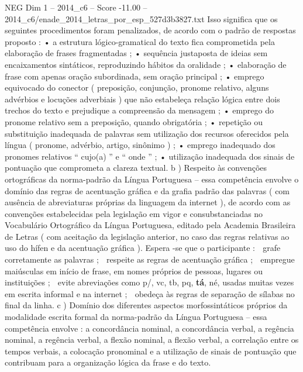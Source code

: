 \begin{textsample}{NEG Dim 1 – 2014\_c6 – Score -11.00 – 2014\_c6/enade\_2014\_letras\_por\_esp\_527d3b3827.txt}
Isso significa que os seguintes procedimentos foram penalizados, de acordo com o padrão de respostas proposto : • a estrutura lógico-gramatical do texto fica comprometida pela elaboração de frases fragmentadas ; • sequência justaposta de ideias sem encaixamentos sintáticos, reproduzindo hábitos da oralidade ; • elaboração de frase com apenas oração subordinada, sem oração principal ; • emprego equivocado do conector ( preposição, conjunção, pronome relativo, alguns advérbios e locuções adverbiais ) que não estabeleça relação lógica entre dois trechos do texto e prejudique a compreensão da mensagem ; • emprego do pronome relativo sem a preposição, quando obrigatória ; • repetição ou substituição inadequada de palavras sem utilização dos recursos oferecidos pela língua ( pronome, advérbio, artigo, sinônimo ) ; • emprego inadequado dos pronomes relativos “ cujo(a) ” e “ onde ” ; • utilização inadequada dos sinais de pontuação que comprometa a clareza textual. b ) Respeito às convenções ortográficas da norma-padrão da Língua Portuguesa – essa competência envolve o domínio das regras de acentuação gráfica e da grafia padrão das palavras ( com ausência de abreviaturas próprias da linguagem da internet ), de acordo com as convenções estabelecidas pela legislação em vigor e consubstanciadas no Vocabulário Ortográfico da Língua Portuguesa, editado pela Academia Brasileira de Letras ( com aceitação da legislação anterior, no caso das regras relativas ao uso do hífen e da acentuação gráfica ).
Espera -se que o participante :  grafe corretamente as palavras ;  respeite as regras de acentuação gráfica ;  empregue maiúsculas em início de frase, em nomes próprios de pessoas, lugares ou instituições ;  evite abreviações como p/, vc, tb, pq, \textbf{tá}, né, usadas muitas vezes em escrita informal e na internet ;  obedeça às regras de separação de sílabas no final da linha. c ) Domínio dos diferentes aspectos morfossintáticos próprios da modalidade escrita formal da norma-padrão da Língua Portuguesa – essa competência envolve : a concordância nominal, a concordância verbal, a regência nominal, a regência verbal, a flexão nominal, a flexão verbal, a correlação entre os tempos verbais, a colocação pronominal e a utilização de sinais de pontuação que contribuam para a organização lógica da frase e do texto.

\end{textsample}
